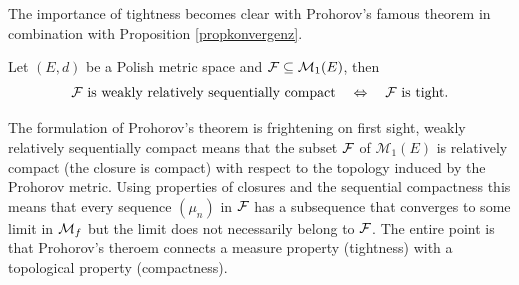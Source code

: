 The importance of tightness becomes clear with Prohorov's famous theorem in combination with Proposition \ref{propkonvergenz}.
\begin{lsatz}
\begin{theorem}[Prohorov]\label{Prohorov}
	Let $(E,d)$ be a Polish metric space and $\mathcal{F} \subseteq \mathcal{M}_1(E)$, then
	\begin{align*}
		 \mathcal{F} \text{ is weakly relatively sequentially compact}\quad \Leftrightarrow \quad \mathcal{F} \text{ is tight}.
	\end{align*}
\end{theorem}
\end{lsatz}
The formulation of Prohorov's theorem is frightening on first sight, weakly relatively sequentially compact means that the subset $\mathcal{F}$ of $\mathcal M_1(E)$ is relatively compact (the closure is compact) with respect to the topology induced by the Prohorov metric. Using properties of closures and the sequential compactness this means that every sequence $(\mu_n)$ in $\mathcal{F}$ has a subsequence that converges to some limit in $\mathcal{M}_f$ but the limit does not necessarily belong to $\mathcal{F}$. The entire point is that Prohorov's theroem connects a measure property (tightness) with a topological property (compactness).
